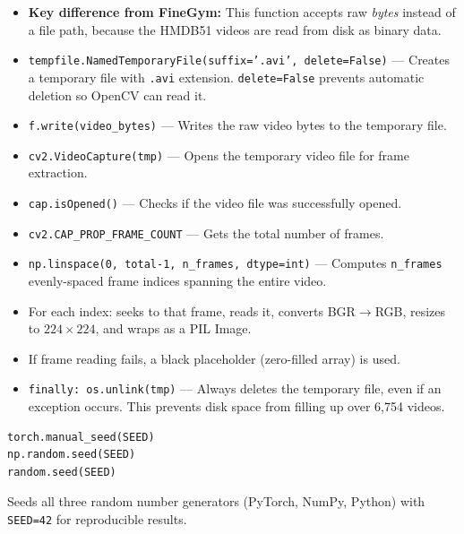 \begin{explanation}
\begin{itemize}[nosep]
  \item \textbf{Key difference from FineGym:} This function accepts raw \textit{bytes} instead of a file path, because the HMDB51 videos are read from disk as binary data.
  \item \texttt{tempfile.NamedTemporaryFile(suffix='.avi', delete=False)} --- Creates a temporary file with \texttt{.avi} extension. \texttt{delete=False} prevents automatic deletion so OpenCV can read it.
  \item \texttt{f.write(video\_bytes)} --- Writes the raw video bytes to the temporary file.
  \item \texttt{cv2.VideoCapture(tmp)} --- Opens the temporary video file for frame extraction.
  \item \texttt{cap.isOpened()} --- Checks if the video file was successfully opened.
  \item \texttt{cv2.CAP\_PROP\_FRAME\_COUNT} --- Gets the total number of frames.
  \item \texttt{np.linspace(0, total-1, n\_frames, dtype=int)} --- Computes \texttt{n\_frames} evenly-spaced frame indices spanning the entire video.
  \item For each index: seeks to that frame, reads it, converts BGR$\to$RGB, resizes to $224 \times 224$, and wraps as a PIL Image.
  \item If frame reading fails, a black placeholder (zero-filled array) is used.
  \item \texttt{finally: os.unlink(tmp)} --- Always deletes the temporary file, even if an exception occurs. This prevents disk space from filling up over 6,754 videos.
\end{itemize}
\end{explanation}

\begin{lstlisting}
torch.manual_seed(SEED)
np.random.seed(SEED)
random.seed(SEED)
\end{lstlisting}

\begin{explanation}
Seeds all three random number generators (PyTorch, NumPy, Python) with \texttt{SEED=42} for reproducible results.
\end{explanation}

\newpage
